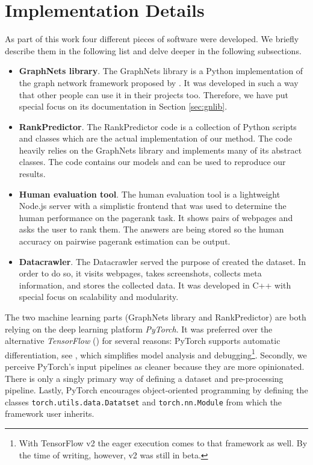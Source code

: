 \section{Implementation Details}

As part of this work four different pieces of software were developed. We briefly describe them in the following list and delve deeper in the following subsections.

\begin{itemize}
    \item \textbf{GraphNets library}. The GraphNets library is a Python implementation of the graph network framework proposed by \cite{deepmind:graphnets}. It was developed in such a way that other people can use it in their projects too. Therefore, we have put special focus on its documentation in Section \ref{sec:gnlib}.
    \item \textbf{RankPredictor}. The RankPredictor code is a collection of Python scripts and classes which are the actual implementation of our method. The code heavily relies on the GraphNets library and implements many of its abstract classes. The code contains our models and can be used to reproduce our results.
    \item \textbf{Human evaluation tool}. The human evaluation tool is a lightweight Node.js server with a simplistic frontend that was used to determine the human performance on the pagerank task. It shows pairs of webpages and asks the user to rank them. The answers are being stored so the human accuracy on pairwise pagerank estimation can be output.
    \item \textbf{Datacrawler}. The Datacrawler served the purpose of created the dataset. In order to do so, it visits webpages, takes screenshots, collects meta information, and stores the collected data. It was developed in C++ with special focus on scalability and modularity.
\end{itemize}

The two machine learning parts (GraphNets library and RankPredictor) are both relying on the deep learning platform \textit{PyTorch}. It was preferred over the alternative \textit{TensorFlow} (\cite{abadi2016:tensorflow}) for several reasons: PyTorch supports automatic differentiation, see \cite{paszke2017automatic:pytorch}, which simplifies model analysis and debugging\footnote{With TensorFlow v2 the eager execution comes to that framework as well. By the time of writing, however, v2 was still in beta.}. Secondly, we perceive PyTorch's input pipelines as cleaner because they are more opinionated. There is only a singly primary way of defining a dataset and pre-processing pipeline. Lastly, PyTorch encourages object-oriented programming by defining the classes \texttt{torch.utils.data.Datatset} and \texttt{torch.nn.Module} from which the framework user inherits.





